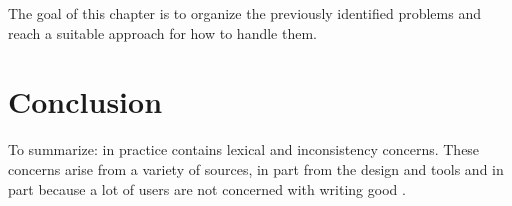 The goal of this chapter is to organize the previously identified
problems and reach a suitable approach for how to handle them.


\section{Conclusion}

To summarize: in practice {\bibtex} contains lexical and inconsistency
concerns.  These concerns arise from a variety of sources, in part
from the design and tools and in part because a lot of users are not
concerned with writing good {\bibtex}.